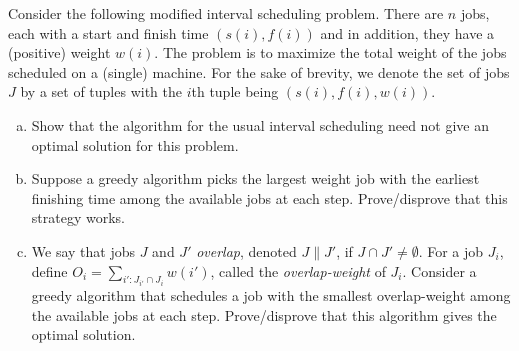 	\begin{exercise}
		Consider the following modified interval scheduling problem. There are $n$ jobs, each with a start and finish time $(s(i),f(i))$ and in addition, they have a (positive) weight $w(i)$. The problem is to maximize the total weight of the jobs scheduled on a (single) machine. For the sake of brevity, we denote the set of jobs $J$ by a set of tuples with the $i$th tuple being $(s(i),f(i),w(i))$.
		\begin{enumerate}[(a)]
			\item Show that the algorithm for the usual interval scheduling need not give an optimal solution for this problem.
			
			\item Suppose a greedy algorithm picks the largest weight job with the earliest finishing time among the available jobs at each step. Prove/disprove that this strategy works.
			
			\item We say that jobs $J$ and $J'$ \textit{overlap}, denoted $J\| J'$, if $J\cap J'\neq\emptyset$. For a job $J_i$, define $O_i = \sum_{i':J_{i'}\cap J_i} w(i')$, called the \textit{overlap-weight} of $J_i$. Consider a greedy algorithm that schedules a job with the smallest overlap-weight among the available jobs at each step. Prove/disprove that this algorithm gives the optimal solution.
		\end{enumerate}
	\end{exercise}

